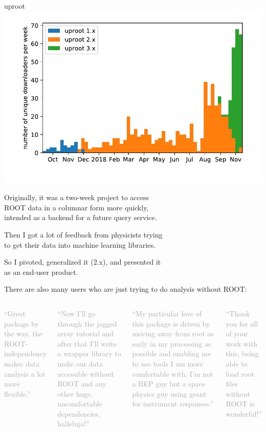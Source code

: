 \documentclass[aspectratio=169]{beamer}
\begin{document}
\begin{frame}{uproot}
\hfill \mbox{\includegraphics[height=4.5 cm]{weeks_byversion.pdf}\hspace{-1 cm}}

\vspace{-4.25 cm}
Originally, it was a two-week project to access \\ ROOT data in a columnar form more quickly, \\ intended as a backend for a future query service.

\vspace{0.35 cm}
Then I got a lot of feedback from physicists trying \\ to get their data into machine learning libraries.

\vspace{0.35 cm}
So I pivoted, generalized it (2.x), and presented it \\ as an end-user product.

\vspace{0.35 cm}
There are also many users who are just trying to do analysis without ROOT:

\scriptsize
\begin{columns}
\textcolor{darkgray}{``Great package by the way, the ROOT-independency makes data analysis a lot more flexible.''}

\vspace{0.25 cm}
\textcolor{darkgray}{``Now I'll go through the jagged array tutorial and after that I'll write a wrapper library to make our data accessible without ROOT and any other huge, uncomfortable dependencies, halleluja!''}


\textcolor{darkgray}{``My particular love of this package is driven by moving away from root as early in my processing as possible and enabling me to use tools I am more comfortable with. I'm not a HEP guy but a space physics guy using geant for instrument responses.''}

\vspace{0.25 cm}
\textcolor{darkgray}{``Thank you for all of your work with this, being able to load root files without ROOT is wonderful!''}
\end{columns}
\end{frame}
\end{document}
